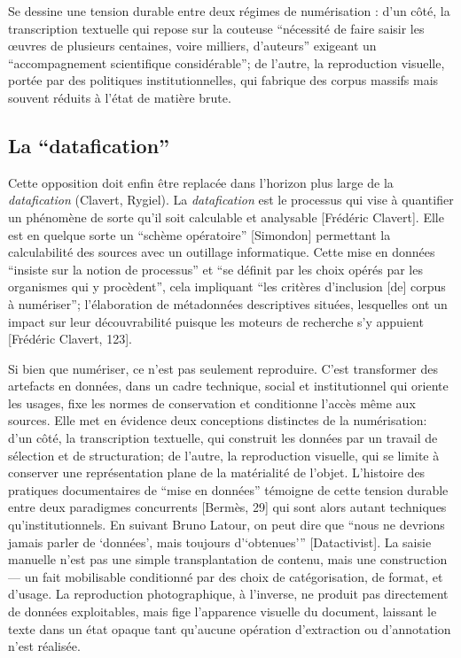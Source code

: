 Se dessine une tension durable entre deux régimes de numérisation : d’un côté, la transcription textuelle qui repose sur la couteuse \enquote{nécessité de faire saisir les œuvres de plusieurs centaines, voire milliers, d’auteurs} exigeant un \enquote{accompagnement scientifique considérable}; de l’autre, la reproduction visuelle, portée par des politiques institutionnelles, qui fabrique des corpus massifs mais souvent réduits à l’état de matière brute.

\subsection{La \enquote{datafication}}

Cette opposition doit enfin être replacée dans l’horizon plus large de la \emph{datafication} (Clavert, Rygiel). La \emph{datafication} est le processus qui vise à quantifier un phénomène de sorte qu'il soit calculable et analysable [Frédéric Clavert]. Elle est en quelque sorte un \enquote{schème opératoire} [Simondon] permettant la calculabilité des sources avec un outillage informatique. Cette mise en données \enquote{insiste sur la notion de processus} et \enquote{se définit par les choix opérés par les organismes qui y procèdent}, cela impliquant \enquote{les critères d'inclusion [de] corpus à numériser}; l'élaboration de métadonnées descriptives situées, lesquelles ont un impact sur leur découvrabilité puisque les moteurs de recherche s'y appuient [Frédéric Clavert, 123].

Si bien que numériser, ce n’est pas seulement reproduire. C’est transformer des artefacts en données, dans un cadre technique, social et institutionnel qui oriente les usages, fixe les normes de conservation et conditionne l’accès même aux sources. Elle met en évidence deux conceptions distinctes de la numérisation: d’un côté, la transcription textuelle, qui construit les données par un travail de sélection et de structuration; de l’autre, la reproduction visuelle, qui se limite à conserver une représentation plane de la matérialité de l’objet. L’histoire des pratiques documentaires de \enquote{mise en données} témoigne de cette tension durable entre deux paradigmes concurrents [Bermès, 29] qui sont alors autant techniques qu'institutionnels. En suivant Bruno Latour, on peut dire que \enquote{nous ne devrions jamais parler de ‘données’, mais toujours d'‘obtenues’} [Datactivist]. La saisie manuelle n'est pas une simple transplantation de contenu, mais une construction — un fait mobilisable conditionné par des choix de catégorisation, de format, et d’usage. La reproduction photographique, à l’inverse, ne produit pas directement de données exploitables, mais fige l’apparence visuelle du document, laissant le texte dans un état opaque tant qu’aucune opération d’extraction ou d’annotation n’est réalisée. 

